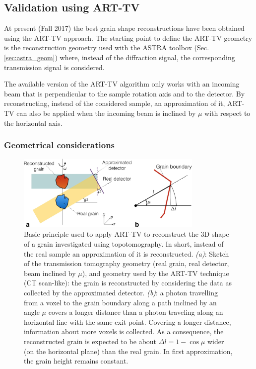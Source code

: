 \documentclass[11pt]{scrartcl}
\begin{document}
\subsection{Validation using ART-TV}

At present (Fall 2017) the best grain shape reconstructions have been obtained using the {\footnotesize{ART-TV}} approach. The starting point to define the {\footnotesize{ART-TV}} geometry is the reconstruction geometry used with the {\footnotesize{ASTRA}} toolbox (Sec. \ref{sec:astra_geom}) where, instead of the diffraction signal, the corresponding transmission signal is considered. 

The available version of the {\footnotesize{ART-TV}} algorithm only works with an incoming beam that is perpendicular to the sample rotation axis and to the detector. By reconstructing, instead of the considered sample, an approximation of it, {\footnotesize{ART-TV}} can also be applied when the incoming beam is inclined by $\mu$ with respect to the horizontal axis.

\subsubsection{Geometrical considerations}

\begin{figure}
    \centering
    \includegraphics[width=0.8\textwidth]{geom_art_tv.png}
    \caption{Basic principle used to apply {\footnotesize{ART-TV}} to reconstruct the {\footnotesize{3D}} shape of a grain investigated using topotomography. In short, instead of the real sample an approximation of it is reconstructed. {\emph{(a)}}: Sketch of the transmission tomography geometry (real grain, real detector, beam inclined by $\mu$), and geometry used by the {\footnotesize{ART-TV}} technique ({\footnotesize{CT}} scan-like): the grain is reconstructed by considering the data as collected by the approximated detector. {\emph{(b)}}: a photon travelling from a voxel to the grain boundary along a path inclined by an angle $\mu$ covers a longer distance than a photon traveling along an horizontal line with the same exit point. Covering a longer distance, information about more voxels is collected. As a consequence, the reconstructed grain is expected to be about $\Delta l = 1-\cos\mu$ wider (on the horizontal plane) than the real grain. In first approximation, the grain height remains constant.}
    \label{fig:art_tv_geometry}
\end{figure}
\end{document}
